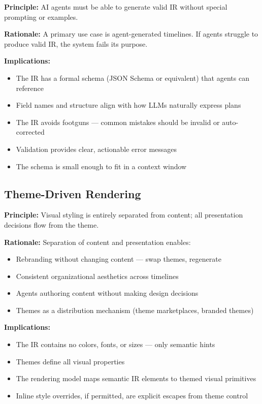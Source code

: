 \textbf{Principle:} AI agents must be able to generate valid IR without special prompting or examples.

\textbf{Rationale:} A primary use case is agent-generated timelines. If agents struggle to produce valid IR, the system fails its purpose.

\textbf{Implications:}
\begin{itemize}
  \item The IR has a formal schema (JSON Schema or equivalent) that agents can reference
  \item Field names and structure align with how LLMs naturally express plans
  \item The IR avoids footguns — common mistakes should be invalid or auto-corrected
  \item Validation provides clear, actionable error messages
  \item The schema is small enough to fit in a context window
\end{itemize}

\subsection{Theme-Driven Rendering}
\label{principle:theme-driven}

\textbf{Principle:} Visual styling is entirely separated from content; all presentation decisions flow from the theme.

\textbf{Rationale:} Separation of content and presentation enables:
\begin{itemize}
  \item Rebranding without changing content — swap themes, regenerate
  \item Consistent organizational aesthetics across timelines
  \item Agents authoring content without making design decisions
  \item Themes as a distribution mechanism (theme marketplaces, branded themes)
\end{itemize}

\textbf{Implications:}
\begin{itemize}
  \item The IR contains no colors, fonts, or sizes — only semantic hints
  \item Themes define all visual properties
  \item The rendering model maps semantic IR elements to themed visual primitives
  \item Inline style overrides, if permitted, are explicit escapes from theme control
\end{itemize}

